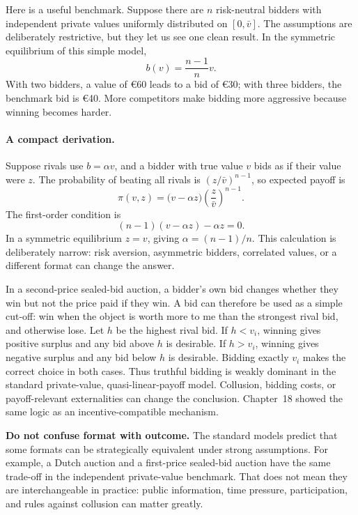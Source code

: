 Here is a useful benchmark. Suppose there are \(n\) risk-neutral bidders with
independent private values uniformly distributed on \([0,\bar v]\). The
assumptions are deliberately restrictive, but they let us see one clean
result. In the symmetric equilibrium of this simple model,
\[
b(v)=\frac{n-1}{n}v.
\]
With two bidders, a value of \euro60 leads to a bid of \euro30; with three
bidders, the benchmark bid is \euro40. More competitors make bidding more
aggressive because winning becomes harder.

\paragraph{A compact derivation.}
Suppose rivals use \(b=\alpha v\), and a bidder with true value \(v\) bids as
if their value were \(z\). The probability of beating all rivals is
\((z/\bar v)^{n-1}\), so expected payoff is
\[
\pi(v,z)
=
\bigl(v-\alpha z\bigr)
\left(\frac{z}{\bar v}\right)^{n-1}.
\]
The first-order condition is
\[
(n-1)(v-\alpha z)-\alpha z=0.
\]
In a symmetric equilibrium \(z=v\), giving
\(\alpha=(n-1)/n\). This calculation is deliberately narrow: risk aversion,
asymmetric bidders, correlated values, or a different format can change the
answer.

In a second-price sealed-bid auction, a bidder's own bid changes whether they
win but not the price paid if they win. A bid can therefore be used as a simple
cut-off: win when the object is worth more to me than the strongest rival bid,
and otherwise lose. Let \(h\) be the highest rival bid. If \(h<v_i\), winning
gives positive surplus and any bid above \(h\) is desirable. If \(h>v_i\),
winning gives negative surplus and any bid below \(h\) is desirable. Bidding
exactly \(v_i\) makes the correct choice in both cases. Thus truthful bidding
is weakly dominant in the standard private-value, quasi-linear-payoff model.
Collusion, bidding costs, or payoff-relevant externalities can change the
conclusion. Chapter~18 showed the same logic as an incentive-compatible
mechanism.

\begin{keyidea}
\textbf{Do not confuse format with outcome.}
The standard models predict that some formats can be strategically equivalent
under strong assumptions. For example, a Dutch auction and a first-price
sealed-bid auction have the same trade-off in the independent private-value
benchmark. That does not mean they are interchangeable in practice: public
information, time pressure, participation, and rules against collusion can
matter greatly.
\end{keyidea}

